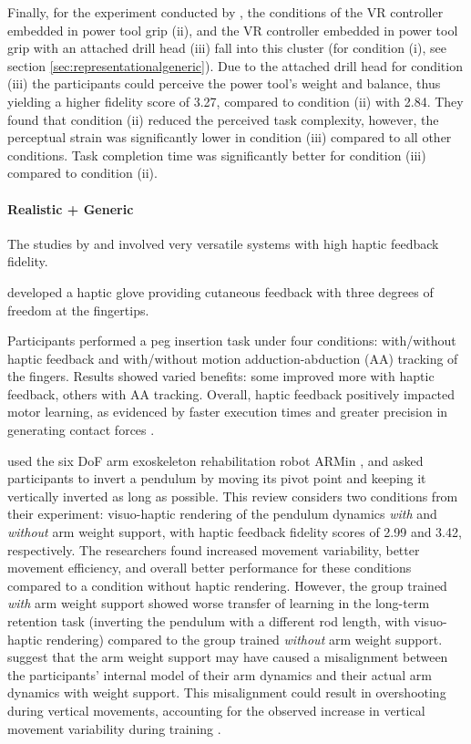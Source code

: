 Finally, for the experiment conducted by \cite{Yang2023}, the conditions of the VR controller embedded in power tool grip (ii), and the VR controller embedded in power tool grip with an attached drill head (iii) fall into this cluster (for condition (i), see section \ref{sec:representationalgeneric}). Due to the attached drill head for condition (iii) the participants could perceive the power tool's weight and balance, thus yielding a higher fidelity score of 3.27, compared to condition (ii) with 2.84. They found that condition (ii) reduced the perceived task complexity, however, the perceptual strain was significantly lower in condition (iii) compared to all other conditions. Task completion time was significantly better for condition (iii) compared to condition (ii).


\paragraph{Realistic + Generic} \label{sec:realisticgeneric}
The studies by \cite{LeeY2019} and \cite{Oezen2022} involved very versatile systems with high haptic feedback fidelity. 

\cite{LeeY2019} developed a haptic glove providing cutaneous feedback with three degrees of freedom at the fingertips. 

Participants performed a peg insertion task under four conditions: with/without haptic feedback and with/without motion adduction-abduction (AA) tracking of the fingers. Results showed varied benefits: some improved more with haptic feedback, others with AA tracking. Overall, haptic feedback positively impacted motor learning, as evidenced by faster execution times and greater precision in generating contact forces \cite{LeeY2019}.


\cite{Oezen2022} used the six DoF arm exoskeleton rehabilitation robot ARMin \cite{Just2018ExoskeletonObserver}, and asked participants to invert a pendulum by moving its pivot point and keeping it vertically inverted as long as possible. This review considers two conditions from their experiment: visuo-haptic rendering of the pendulum dynamics \textit{with} and \textit{without} arm weight support, with haptic feedback fidelity scores of 2.99 and 3.42, respectively. The researchers found increased movement variability, better movement efficiency, and overall better performance for these conditions compared to a condition without haptic rendering. However, the group trained \textit{with} arm weight support showed worse transfer of learning in the long-term retention task (inverting the pendulum with a different rod length, with visuo-haptic rendering) compared to the group trained \textit{without} arm weight support. \cite{Oezen2022} suggest that the arm weight support may have caused a misalignment between the participants' internal model of their arm dynamics and their actual arm dynamics with weight support. This misalignment could result in overshooting during vertical movements, accounting for the observed increase in vertical movement variability during training \cite{Oezen2022}.

